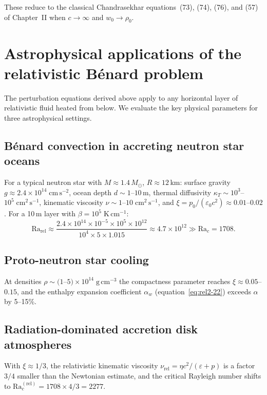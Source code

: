 These reduce to the classical Chandrasekhar equations~(73), (74), (76), and
(57) of Chapter~II when $c \to \infty$ and $w_0 \to \rho_0$.

\section{Astrophysical applications of the relativistic B\'enard problem}
\label{sec:rel9-applications}

The perturbation equations derived above apply to any horizontal layer of
relativistic fluid heated from below.  We evaluate the key physical
parameters for three astrophysical settings.

\subsection{B\'enard convection in accreting neutron star oceans}

For a typical neutron star with $M\approx 1.4\,M_\odot$, $R\approx 12$\,km:
surface gravity $g\approx 2.4\times 10^{14}\;\mathrm{cm\,s^{-2}}$,
ocean depth $d\sim 1$--$10$\,m, thermal diffusivity
$\kappa_T\sim 10^{3}$--$10^{5}\;\mathrm{cm^{2}\,s^{-1}}$,
kinematic viscosity $\nu\sim 1$--$10\;\mathrm{cm^{2}\,s^{-1}}$, and
$\xi=p_{0}/(\varepsilon_{0}c^{2})\approx 0.01$--$0.02$.
For a 10\,m layer with $\beta=10^{5}\;\mathrm{K\,cm^{-1}}$:
\[
\mathrm{Ra}_{\mathrm{rel}}
\approx \frac{2.4\times 10^{14}\times 10^{-5}\times 10^{5}\times 10^{12}}
       {10^{4}\times 5\times 1.015}
\approx 4.7\times 10^{12} \gg \mathrm{Ra}_{c}=1708.
\]

\subsection{Proto-neutron star cooling}

At densities $\rho\sim (1$--$5)\times 10^{14}\;\mathrm{g\,cm^{-3}}$
the compactness parameter reaches $\xi\approx 0.05$--$0.15$,
and the enthalpy expansion coefficient $\alpha_w$
(equation~\eqref{eq:rel2-22}) exceeds $\alpha$ by 5--15\%.

\subsection{Radiation-dominated accretion disk atmospheres}

With $\xi\approx 1/3$, the relativistic kinematic viscosity
$\nu_{\mathrm{rel}}=\eta c^{2}/(\varepsilon+p)$ is a factor $3/4$ smaller
than the Newtonian estimate, and the critical Rayleigh number shifts to
$\mathrm{Ra}_{c}^{(\mathrm{rel})}=1708\times 4/3=2277$.

